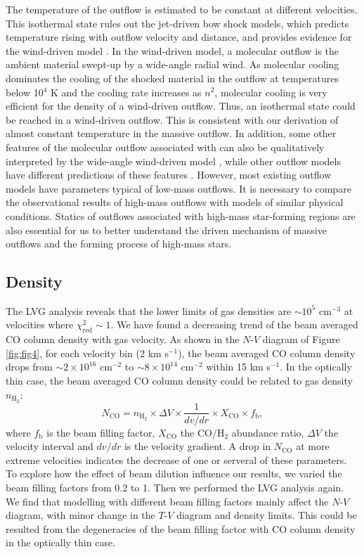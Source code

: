 The temperature of the outflow is estimated to be constant at different velocities. This isothermal state rules out the jet-driven bow shock models, which predicts temperature rising with outflow velocity and distance, and provides evidence for the wind-driven model \citep{2007prpl.conf..245A}. In the wind-driven model, a molecular outflow is the ambient material swept-up by a wide-angle radial wind. As molecular cooling dominates the cooling of the shocked material in the outflow at temperatures below 10$^4$ K \citep{1997IAUS..182..181H} and the cooling rate increases as $n^2$, molecular cooling is very efficient for the density of a wind-driven outflow. Thus, an isothermal state could be reached in a wind-driven outflow. This is consistent with our derivation of almost constant temperature in the massive  outflow. In addition, some other features of the molecular outflow associated with  can also be qualitatively interpreted by the wide-angle wind-driven model \citep{2009ApJ...696...66Q}, while other outflow models have different predictions of these features \citep{2007prpl.conf..245A}. However, most existing outflow models have parameters typical of low-mass outflows. It is necessary to compare the observational results of high-mass outflows with models of similar physical conditions. Statics of outflows associated with high-mass star-forming regions are also essential for us to better understand the driven mechanism of massive outflows and the forming process of high-mass stars.

\subsection{Density}

The LVG analysis reveals that the lower limits of gas densities are $\sim 10^5$ cm$^{-3}$ at velocities where $\chi^2_{\mathrm{red}} \sim 1$. We have found a decreasing trend of the beam averaged CO column density with gas velocity. As shown in the $N$-$V$ diagram of Figure \ref{fig:fig4}, for each velocity bin (2 km s$^{-1}$), the beam averaged CO column density drops from $\sim 2 \times  10^{16} $ cm$^{-2}$ to $\sim 8 \times 10^{14}$ cm$^{-2}$ within 15 km s$^{-1}$. In the optically thin case, the beam averaged CO column density could be related to gas density $n_{\mathrm{H}_2}$: 
\begin{equation}
N_{\mathrm{CO}} = n_{\mathrm{H}_2} \times \Delta V \times \frac{1}{dv/dr} \times X_{\mathrm{CO}} \times f_{\mathrm{b}}, 
\end{equation}
where $f_{\mathrm{b}}$ is the beam filling factor, $X_{\mathrm{CO}}$ the CO/H$_2$ abundance ratio, $\Delta V$ the velocity interval and $dv/dr$ is the velocity gradient. A drop in $N_{\mathrm{CO}}$ at more extreme velocities indicates the decrease of one or serveral of these parameters. 
To explore how the effect of beam dilution influence our results, we varied the beam filling factors from 0.2 to 1. Then we performed the LVG analysis again. We find that modelling with different beam filling factors mainly affect the $N$-$V$ diagram, with minor change in the $T$-$V$ diagram and density limits. This could be resulted from the degeneracies of the beam filling factor with CO column density in the optically thin case. 

